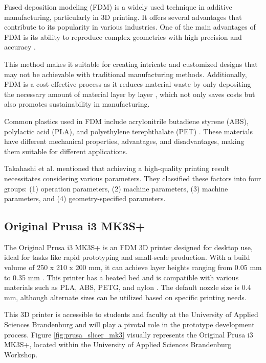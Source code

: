 Fused deposition modeling (FDM) is a widely used technique in additive manufacturing, particularly in 3D printing. It offers several advantages that contribute to its popularity in various industries. One of the main advantages of FDM is its ability to reproduce complex geometries with high precision and accuracy \cite{Gordeev18}.

This method makes it suitable for creating intricate and customized designs that may not be achievable with traditional manufacturing methods. Additionally, FDM is a cost-effective process as it reduces material waste by only depositing the necessary amount of material layer by layer \cite{Gordeev18}, which not only saves costs but also promotes sustainability in manufacturing.

Common plastics used in FDM include acrylonitrile butadiene styrene (ABS), polylactic acid (PLA), and polyethylene terephthalate (PET) \cite{Teamm17}. These materials have different mechanical properties, advantages, and disadvantages, making them suitable for different applications.

Takahashi et al. \cite{Takahashi17} mentioned that achieving a high-quality printing result necessitates considering various parameters. They classified these factors into four groups: (1) operation parameters, (2) machine parameters, (3) machine parameters, and (4) geometry-specified parameters.

\subsection{Original Prusa i3 MK3S+}
\label{subsec:prusa_slicer_mk3s}

The Original Prusa i3 MK3S+ is an FDM 3D printer designed for desktop use, ideal for tasks like rapid prototyping and small-scale production. With a build volume of 250 x 210 x 200 mm, it can achieve layer heights ranging from 0.05 mm to 0.35 mm \cite{Prusa}. This printer has a heated bed and is compatible with various materials such as PLA, ABS, PETG, and nylon \cite{Prusa}. The default nozzle size is 0.4 mm, although alternate sizes can be utilized based on specific printing needs.

This 3D printer is accessible to students and faculty at the University of Applied Sciences Brandenburg and will play a pivotal role in the prototype development process. Figure \ref{fig:prusa_slicer_mk3} visually represents the Original Prusa i3 MK3S+, located within the University of Applied Sciences Brandenburg Workshop.


